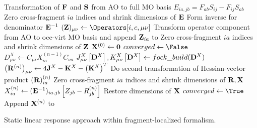 \begin{algorithm}
  \begin{algorithmic}[1]
    \State Transformation of \(\mathbf{F}\) and \(\mathbf{S}\) from AO to full MO basis
    \State \(E_{ia,jb} = F_{ab}S_{ij} - F_{ij}S_{ab}\)
    \If{\Not{} \AllowCT{}}
      \State Zero cross-fragment \(ia\) indices and shrink dimensions of \(\mathbf{E}\)
    \EndIf
    \State Form inverse for denominator \(\mathbf{E}^{-1}\)
  \EndFor
      \State \((\mat{Z})_{\mu\nu} \gets \Operators[i,c,\mu\nu]\)
      \State Transform operator component from AO to occ-virt MO basis and append \(\mathbf{Z}_{ia}\) to \Rhsvecs
      \If{\Not{} \AllowCT{}}
        \State Zero cross-fragment \(ia\) indices and shrink dimensions of \(\mathbf{Z}\)
      \EndIf
      \State \(\mathbf{X}^{(0)} \gets \mathbf{0}\)
      \State \(converged \gets \False\)
        \State \(D_{\mu\nu}^{X} \gets C_{\mu i} X_{ia}^{(n-1)} C_{\nu a}\)
        \State \(J_{\mu\nu}^{X}\left[\mathbf{D}^{X}\right], K_{\mu\nu}^{X}\left[\mathbf{D}^{X}\right] \gets fock\_build(\mathbf{D}^{X})\)
        \State \(\left(\mathbf{R}^{(n)}\right)_{\mu\nu} \gets 4 \mathbf{J}^{X} - \mathbf{K}^{X} - \left(\mathbf{K}^{X}\right)^{T}\)
        \State Do second transformation of Hessian-vector product \(\left(\mathbf{R}\right)_{ia}^{(n)}\)
        \If{\Not{} \AllowCT{}}
          \State Zero cross-fragment \(ia\) indices and shrink dimensions of \(\mathbf{R}, \mathbf{X}\)
        \EndIf
        \State \(X_{ia}^{(n)} \gets (\mathbf{E}^{-1})_{ia,jb} \left[ Z_{jb} - R_{jb}^{(n)} \right]\)
        \If{\Not{} \AllowCT{}}
          \State Restore dimensions of \(\mathbf{X}\)
        \EndIf
          \State \(converged \gets \True\)
          \State Append \(\mathbf{X}^{(n)}\) to \Rspvecs
          \State \Break
        \EndIf
  \end{algorithmic}
  \caption{Static linear response approach within fragment-localized formalism.}
  \label{alg:solve-linear-response}
\end{algorithm}
